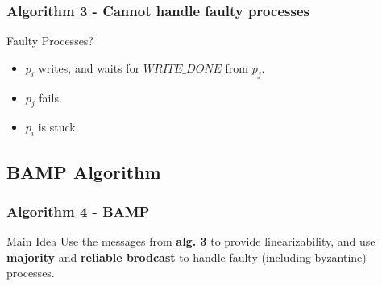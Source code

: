 \begin{frame}
    \frametitle{Algorithm 3 - Cannot handle faulty processes}
    \begin{center}
        \begin{alertblock}{Faulty Processes?}
            \begin{itemize}
                \item $p_i$ writes, and waits for $WRITE\_DONE$ from $p_j$.
                \item $p_j$ fails.
                \item $p_i$ is stuck.
            \end{itemize}
        \end{alertblock}
    \end{center}
\end{frame}

\subsection{BAMP Algorithm}

\begin{frame}
    \frametitle{Algorithm 4 - BAMP}
    \begin{block}{Main Idea}
        Use the messages from \textbf{alg. 3} to provide linearizability,
        and use \textbf{majority} and \textbf{reliable brodcast}
        to handle faulty (including byzantine) processes.
    \end{block}
\end{frame}

